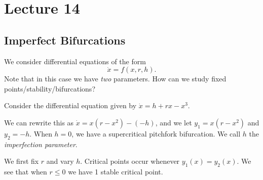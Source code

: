 \documentclass[class=article, crop=false]{standalone}
\begin{document}
  \section{Lecture 14}
  \subsection{Imperfect Bifurcations}
  We consider differential equations of the form
  \[
    \dot{x} = f(x, r, h).
  \]
  Note that in this case we have \emph{two} parameters. How can we study fixed points/stability/bifurcations?
  \begin{example}{}
    Consider the differential equation given by $\dot{x} = h + rx - x^3$. \par
    We can rewrite this as $\dot{x} = x(r - x^2) - (-h)$, and we let $y_1 = x(r - x^2)$ and $y_2 = -h$. When $h = 0$, we have a supercritical pitchfork bifurcation. We call $h$ the \emph{imperfection parameter}. \par
    We first fix $r$ and vary $h$. Critical points occur whenever $y_1(x) = y_2(x)$. We see that when $r \leq 0$ we have 1 stable critical point. \par
  \end{example}
\end{document}
